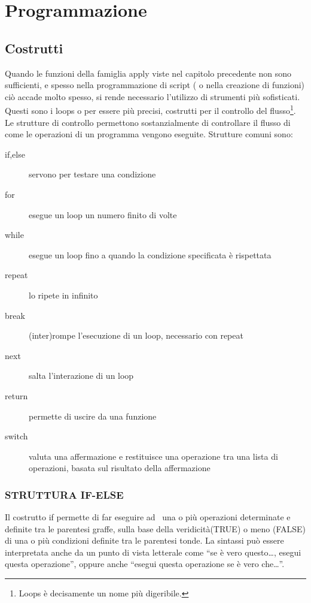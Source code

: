 \chapter{Programmazione}

\section{Costrutti}
Quando le funzioni della famiglia \textsf{apply} viste nel capitolo precedente non sono sufficienti, e spesso nella programmazione di script ( o nella creazione di funzioni) ciò accade molto spesso, si rende necessario l'utilizzo di strumenti più sofisticati. Questi sono i \textsf{loops} o per essere più precisi, costrutti per il controllo del flusso\footnote{\textsf{Loops} è decisamente un nome più digeribile.}.
Le strutture di controllo permettono sostanzialmente di controllare il flusso di come le operazioni di un programma vengono eseguite. Strutture comuni sono:

\begin{description}
\item[if,else] servono per testare una condizione \\
\item[for] esegue un loop un numero finito di volte \\
\item[while] esegue un loop fino a quando la condizione specificata è rispettata \\
\item[repeat] lo ripete in infinito \\
\item[break] (inter)rompe l'esecuzione di un loop, necessario con repeat \\
\item[next] salta l'interazione di un loop \\
\item[return] permette di uscire da una funzione \\
\item[switch] valuta una affermazione e restituisce una operazione tra una lista di operazioni, basata sul risultato della affermazione\\
\end{description}

\subsection{STRUTTURA IF-ELSE}

Il costrutto \textsf{if} permette di far eseguire ad \erre\ una o più operazioni determinate e definite tra le parentesi graffe, sulla base della veridicità(\textsf{TRUE}) o meno (\textsf{FALSE}) di una o più condizioni definite tra le parentesi tonde. La sintassi può essere interpretata anche da un punto di vista letterale come ``se è vero questo\dots, esegui questa operazione'', oppure anche ``esegui questa operazione se è vero che\dots''.

